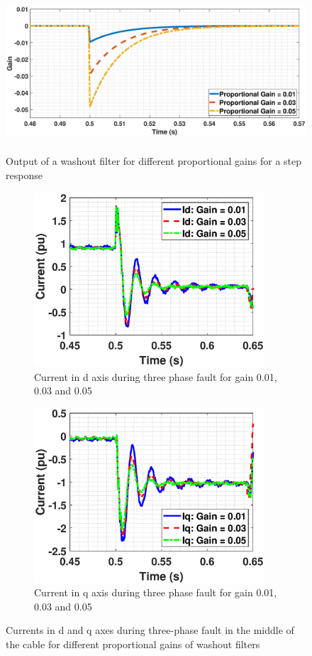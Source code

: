 \begin{figure}[H]
\centering
    \includegraphics[height = 6cm,width = 14.5cm]{Diagrams/Chapter_3/Washout_gain_output_4.eps}
    \caption{Output of a washout filter for different proportional gains for a step response}
    \label{fig:Washout_gain_output}
\end{figure}

\begin{figure}[H]
\begin{subfigure}{0.5\textwidth}
  \includegraphics[height = 6.5cm,width = \textwidth]{Diagrams/Chapter_3/ID_Washout_Comp_4.eps}
  \caption{Current in d axis during three phase fault for gain 0.01, 0.03 and 0.05}
  \label{fig:ID_Washout_Comp}
\end{subfigure}%
\begin{subfigure}{0.5\textwidth}
  \includegraphics[height = 6.5cm,width = \textwidth]{Diagrams/Chapter_3/IQ_Washout_Comp_4.eps}
  \caption{Current in q axis during three phase fault for gain 0.01, 0.03 and 0.05}
  \label{fig:IQ_Washout_Comp}
\end{subfigure}
\caption{Currents in d and q axes during three-phase fault in the middle of the cable for different proportional gains of washout filters}
\label{fig:ID_IQ_Washout_Comp}
\end{figure}

